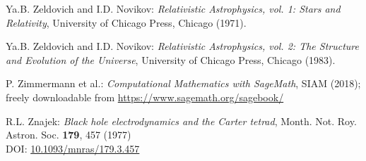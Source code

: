 \begin{thebibliography}{123}
Ya.B. Zeldovich and I.D. Novikov:
{\em Relativistic Astrophysics, vol. 1: Stars and Relativity},
University of Chicago Press, Chicago (1971).

Ya.B. Zeldovich and I.D. Novikov:
{\em Relativistic Astrophysics, vol. 2: The Structure and Evolution of the Universe},
University of Chicago Press, Chicago (1983).

P. Zimmermann et al.: {\em Computational Mathematics with SageMath}, SIAM (2018);
freely downloadable from \url{https://www.sagemath.org/sagebook/}

R.L. Znajek:
{\em Black hole electrodynamics and the Carter tetrad},
Month. Not. Roy. Astron. Soc. {\bf 179}, 457 (1977)\\
DOI: \href{https://doi.org/10.1093/mnras/179.3.457}{10.1093/mnras/179.3.457}

\end{thebibliography}
